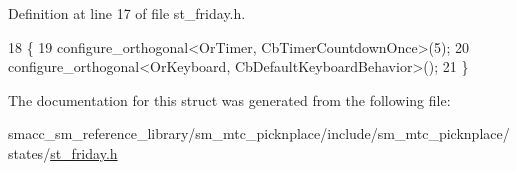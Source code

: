 Definition at line 17 of file st\+\_\+friday.\+h.


\begin{DoxyCode}
18     \{
19         configure\_orthogonal<OrTimer,  CbTimerCountdownOnce>(5);    
20         configure\_orthogonal<OrKeyboard, CbDefaultKeyboardBehavior>();
21     \}
\end{DoxyCode}


The documentation for this struct was generated from the following file\+:\begin{DoxyCompactItemize}
\item 
smacc\+\_\+sm\+\_\+reference\+\_\+library/sm\+\_\+mtc\+\_\+picknplace/include/sm\+\_\+mtc\+\_\+picknplace/states/\hyperlink{sm__mtc__picknplace_2include_2sm__mtc__picknplace_2states_2st__friday_8h}{st\+\_\+friday.\+h}\end{DoxyCompactItemize}
